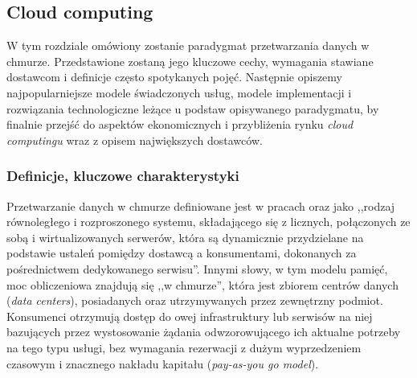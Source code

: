 \documentclass[12pt,a4paper,twoside]{article}
\begin{document}
\clearpage

\subsection{Cloud computing}

\noindent
W tym rozdziale omówiony zostanie paradygmat przetwarzania danych w chmurze. Przedstawione zostaną jego kluczowe cechy, wymagania stawiane dostawcom i definicje często spotykanych pojęć. Następnie opiszemy najpopularniejsze modele świadczonych usług, modele implementacji i rozwiązania technologiczne leżące u podstaw opisywanego paradygmatu, by finalnie przejść do aspektów ekonomicznych i przybliżenia rynku \textit{cloud computingu} wraz z opisem największych dostawców.

\subsubsection{Definicje, kluczowe charakterystyki}

\noindent
Przetwarzanie danych w chmurze definiowane jest w pracach \citet{buyya2009} oraz \citet{calheiros2010} jako ,,rodzaj równoległego i rozproszonego systemu, składającego się z licznych, połączonych ze sobą i wirtualizowanych serwerów, która są dynamicznie przydzielane na podstawie ustaleń pomiędzy dostawcą a konsumentami, dokonanych za pośrednictwem dedykowanego serwisu''. Innymi słowy, w tym modelu pamięć, moc obliczeniowa znajdują się ,,w chmurze'', która jest zbiorem centrów danych (\textit{data centers}), posiadanych oraz utrzymywanych przez zewnętrzny podmiot. Konsumenci otrzymują dostęp do owej infrastruktury lub serwisów na niej bazujących przez wystosowanie żądania odwzorowującego ich aktualne potrzeby na tego typu usługi, bez wymagania rezerwacji z dużym wyprzedzeniem czasowym i znacznego nakładu kapitału (\textit{pay-as-you go model}).
\end{document}
